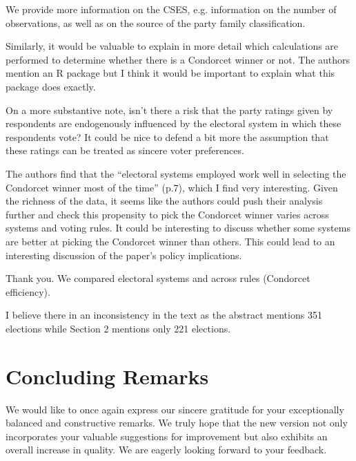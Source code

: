 \documentclass[a4paper, 12pt]{scrartcl}
\theoremstyle{break}
\newenvironment{changes}{\par\color{violet}\par\addvspace{\baselineskip}}{\par\addvspace{\baselineskip}}
\begin{document}
We provide more information on the CSES, e.g. information on the number of observations, as well as on the source of the party family classification.

\begin{changes}
	Similarly, it would be valuable to explain in more detail which calculations are performed to determine whether there is a Condorcet winner or not. The authors mention an R package but I think it would be important to explain what this package does exactly.
\end{changes}

\begin{changes}
	On a more substantive note, isn’t there a risk that the party ratings given by respondents are endogenously influenced by the electoral system in which these respondents vote? It could be nice to defend a bit more the assumption that these ratings can be treated as
	sincere voter preferences.
\end{changes}

\begin{changes}
	The authors ﬁnd that the “electoral systems employed work well in selecting the Condorcet winner most of the time” (p.7), which I ﬁnd very interesting. Given the richness of the data, it seems like the authors could push their analysis further and check this propensity to pick the
	Condorcet winner varies across systems and voting rules. It could be interesting to discuss whether some systems are better at picking the Condorcet winner than others. This could lead to an interesting discussion of the paper’s policy implications.
\end{changes}

Thank you. We compared electoral systems and across rules (Condorcet efficiency).

\begin{changes}
	I believe there in an inconsistency in the text as the abstract mentions 351 elections while Section 2 mentions only 221 elections.
\end{changes}




\newpage
\section{Concluding Remarks}

We would like to once again express our sincere gratitude for your exceptionally balanced and constructive remarks. We truly hope that the new version not only incorporates your valuable suggestions for improvement but also exhibits an overall increase in quality. We are eagerly looking forward to your feedback.



\end{document}
